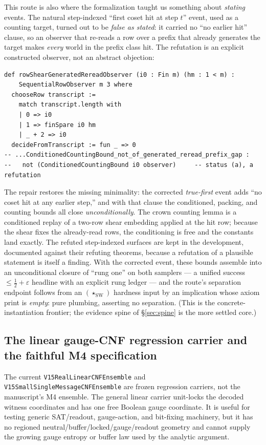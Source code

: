 \documentclass[11pt]{article}
\theoremstyle{definition}
\newcommand{\StarSW}{(\star_{\mathrm{SW}})}
\begin{document}
This route is also where the formalization taught us something about
\emph{stating} events. The natural step-indexed ``first coset hit at step $t$''
event, used as a counting target, turned out to be \emph{false as stated}: it
carried no ``no earlier hit'' clause, so an observer that re-reads a row over a
prefix that already generates the target makes \emph{every} world in the prefix
class hit. The refutation is an explicit constructed observer, not an abstract
objection:
\begin{lstlisting}
def rowShearGeneratedRereadObserver (i0 : Fin m) (hm : 1 < m) :
    SequentialRowObserver m 3 where
  chooseRow transcript :=
    match transcript.length with
    | 0 => i0
    | 1 => finSpare i0 hm
    | _ + 2 => i0
  decideFromTranscript := fun _ => 0
-- ...ConditionedCountingBound_not_of_generated_reread_prefix_gap :
--   not (ConditionedCountingBound i0 observer)     -- status (a), a refutation
\end{lstlisting}
The repair restores the missing minimality: the corrected \emph{true-first} event
adds ``no coset hit at any earlier step,'' and with that clause the conditioned,
packing, and counting bounds all close \emph{unconditionally}. The crown counting
lemma is a conditioned replay of a two-row shear embedding applied at the hit row;
because the shear fixes the already-read rows, the conditioning is free and the
constants land exactly. The refuted step-indexed surfaces are kept in the
development, documented against their refuting theorems, because a refutation of a
plausible statement is itself a finding. With the corrected event, these bounds
assemble into an unconditional closure of ``rung one'' on both samplers --- a
unified success $\le\tfrac12+\varepsilon$ headline with an explicit rung ledger ---
and the route's separation endpoint follows from an $\StarSW$ hardness input by an
implication whose axiom print is \emph{empty}: pure plumbing, asserting no
separation. (This is the concrete-instantiation frontier; the evidence spine of
\S\ref{sec:spine} is the more settled core.)

\subsection{The linear gauge-CNF regression carrier and the faithful M4 specification}
\label{sec:realM4}
The current \texttt{V15RealLinearCNFEnsemble} and
\texttt{V15SmallSingleMessageCNFEnsemble} are frozen regression carriers, not the
manuscript's M4 ensemble.  The general linear carrier unit-locks the decoded witness
coordinates and has one free Boolean gauge coordinate.  It is useful for testing
generic SAT/readout, gauge-action, and bit-fixing machinery, but it has no regioned
neutral/buffer/locked/gauge/readout geometry and cannot supply the growing gauge
entropy or buffer law used by the analytic argument.
\end{document}
